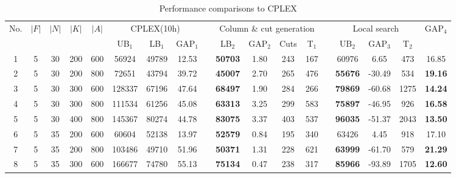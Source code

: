 \documentclass[11pt,nonblindrev,fleqn]{article}
\begin{document}
\begin{table}[H]
\setlength{\abovecaptionskip}{-3pt}
\setlength{\belowcaptionskip}{5pt}
\centering
  \footnotesize
  \caption{Performance comparisons to CPLEX}
  \label{results}

\begin{tabular}{cccccccccccccccccc}
\hline
\multirow{2}[4]{*}{No.} & \multirow{2}[4]{*}{$|F|$} & \multirow{2}[4]{*}{$|N|$} & \multirow{2}[4]{*}{$|K|$} & \multirow{2}[4]{*}{$|A|$} & \multicolumn{3}{c}{CPLEX(10h)} & \multirow{2}[4]{*}{} & \multicolumn{4}{c}{Column \& cut generation } & \multirow{2}[4]{*}{} & \multicolumn{3}{c}{Local search} & \multirow{2}[4]{*}{GAP$_4$} \bigstrut\\
\cline{6-8}\cline{10-13}\cline{15-17}      &       &       &       &       & UB$_1$ & LB$_1$ & GAP$_1$ &       & LB$_2$ & GAP$_2$ & Cuts  & T$_1$ &       & UB$_2$ & GAP$_3$ & T$_2$ &  \bigstrut\\
\hline
1     & 5     & 30    & 200   & 600   & 56924 & 49789 & 12.53  &       & \textbf{50703 } & 1.80  & 243   & 167   &       & 60976 & 6.65  & 473   & 16.85  \bigstrut[t]\\
2     & 5     & 30    & 200   & 800   & 72651 & 43794 & 39.72  &       & \textbf{45007 } & 2.70  & 265   & 476   &       & \textbf{55676} & -30.49  & 534   & \textbf{19.16 } \\
3     & 5     & 30    & 300   & 600   & 128337 & 67196 & 47.64  &       & \textbf{68497 } & 1.90  & 284   & 266   &       & \textbf{79869} & -60.68  & 1275  & \textbf{14.24 } \\
4     & 5     & 30    & 300   & 800   & 111534 & 61256 & 45.08  &       & \textbf{63313 } & 3.25  & 299   & 583   &       & \textbf{75897} & -46.95  & 926   & \textbf{16.58 } \\
5     & 5     & 30    & 400   & 800   & 145367 & 80274 & 44.78  &       & \textbf{83075 } & 3.37  & 403   & 537   &       & \textbf{96035} & -51.37  & 2043  & \textbf{13.50 } \\
6     & 5     & 35    & 200   & 600   & 60604 & 52138 & 13.97  &       & \textbf{52579 } & 0.84  & 195   & 340   &       & 63426 & 4.45  & 918   & 17.10  \\
7     & 5     & 35    & 200   & 800   & 103486 & 49710 & 51.96  &       & \textbf{50371 } & 1.31  & 228   & 621   &       & \textbf{63999} & -61.70  & 579   & \textbf{21.29 } \\
8     & 5     & 35    & 300   & 600   & 166677 & 74780 & 55.13  &       & \textbf{75134 } & 0.47  & 238   & 317   &       & \textbf{85966} & -93.89  & 1705  & \textbf{12.60 } \\

\end{tabular}
\end{table}
\end{document}
